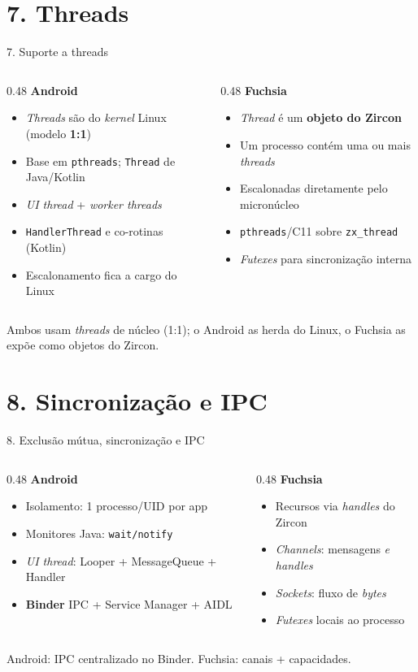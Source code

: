 \documentclass[aspectratio=169,11pt]{beamer}
\newcommand{\ANDROID}{\textbf{\color{androidVerde}Android}}
\newcommand{\FUCHSIA}{\textbf{\color{fuchsiaCor}Fuchsia}}
\newcommand{\comparar}[2]{%
  \begin{columns}[T,onlytextwidth]
    \begin{column}{0.48\textwidth}
      \ANDROID\par\smallskip
      \begin{itemize}\footnotesize #1 \end{itemize}
    \end{column}
    \begin{column}{0.48\textwidth}
      \FUCHSIA\par\smallskip
      \begin{itemize}\footnotesize #2 \end{itemize}
    \end{column}
  \end{columns}%
}
\begin{document}
\section{7. Threads}

\begin{frame}{7. Suporte a threads}
  \comparar{
    \item \emph{Threads} são do \emph{kernel} Linux (modelo \textbf{1:1})
    \item Base em \texttt{pthreads}; \texttt{Thread} de Java/Kotlin
    \item \emph{UI thread} + \emph{worker threads}
    \item \texttt{HandlerThread} e co-rotinas (Kotlin)
    \item Escalonamento fica a cargo do Linux
  }{
    \item \emph{Thread} é um \textbf{objeto do Zircon}
    \item Um processo contém uma ou mais \emph{threads}
    \item Escalonadas diretamente pelo micronúcleo
    \item \texttt{pthreads}/C11 sobre \texttt{zx\_thread}
    \item \emph{Futexes} para sincronização interna
  }
  \vfill
  {\scriptsize\color{gray} Ambos usam \emph{threads} de núcleo (1:1); o Android as herda do Linux, o Fuchsia as expõe como objetos do Zircon.}
\end{frame}

\section{8. Sincronização e IPC}

\begin{frame}{8. Exclusão mútua, sincronização e IPC}
  \comparar{
    \item Isolamento: 1 processo/UID por app
    \item Monitores Java: \texttt{wait/notify}
    \item \emph{UI thread}: Looper + MessageQueue + Handler
    \item \textbf{Binder} IPC + Service Manager + AIDL
  }{
    \item Recursos via \emph{handles} do Zircon
    \item \emph{Channels}: mensagens \emph{e} \emph{handles}
    \item \emph{Sockets}: fluxo de \emph{bytes}
    \item \emph{Futexes} locais ao processo
  }
  \vfill
  \begin{center}\small
    Android: IPC centralizado no Binder. \quad Fuchsia: canais + capacidades.
  \end{center}
\end{frame}
\end{document}
